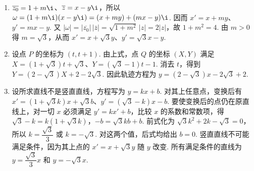 \begin{solution}
\begin{enumerate}
\item \(\overline{z_0}=1+m\i\)、\(\overline z=x-y\i\)，所以
\(\omega=(1+m\i)(x-y\i)=(x+my)+(mx-y)\i\). 因而 \(x'=x+my\)、\(y'=mx-y\). 又 \(|\omega|=|\overline{z_0}|\,|\overline z|=\sqrt{1+m^2}\,|z|=2|z|\)，故 \(1+m^2=4\). 由 \(m>0\) 得 \(m=\sqrt{3}\)，从而 \(x'=x+\sqrt{3}y\)、\(y'=\sqrt{3}x-y\).
\item 设点 \(P\) 的坐标为 \((t,t+1)\). 由上式，点 \(Q\) 的坐标 \((X,Y)\) 满足 \(X=(1+\sqrt{3})t+\sqrt{3}\)、\(Y=(\sqrt{3}-1)t-1\). 消去 \(t\)，得到
\(Y=(2-\sqrt{3})X+2-2\sqrt{3}\). 因此轨迹方程为 \(y=(2-\sqrt{3})x-2\sqrt{3}+2\).
\item 设所求直线不是竖直直线，方程写为 \(y=kx+b\). 对其上任意点，变换后有 \(x'= (1+\sqrt{3}k)x+\sqrt{3}b\)、\(y'=(\sqrt{3}-k)x-b\). 要使变换后的点仍在原直线上，对一切 \(x\) 必须满足 \(y'=kx'+b\)，比较 \(x\) 的系数和常数项，得
\(\sqrt{3}-k=k(1+\sqrt{3}k)\)，\(-b=\sqrt{3}kb+b\).
前式化为 \(\sqrt{3}k^2+2k-\sqrt{3}=0\)，所以 \(k=\dfrac{\sqrt{3}}{3}\) 或 \(k=-\sqrt{3}\). 对这两个值，后式均给出 \(b=0\). 竖直直线不可能满足条件，因为其上点的 \(x'=x+\sqrt{3}y\) 随 \(y\) 改变. 所有满足条件的直线为 \(y=\dfrac{\sqrt{3}}{3}x\) 和 \(y=-\sqrt{3}x\).
\end{enumerate}
\end{solution}
